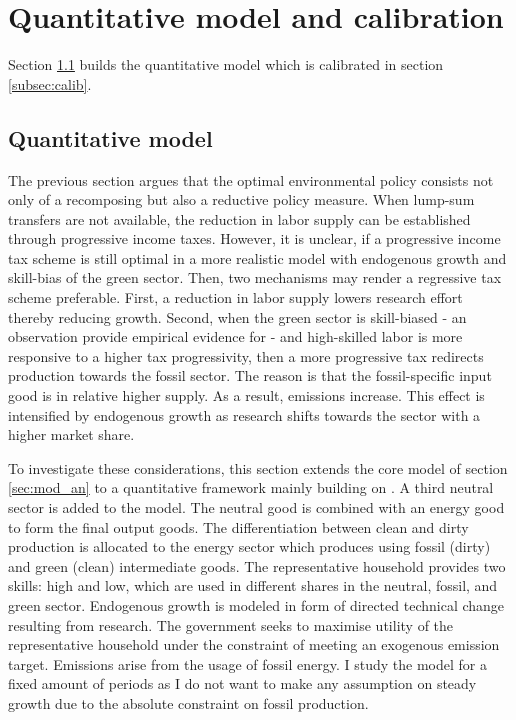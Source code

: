 \section{Quantitative model and calibration}\label{sec:model}
Section \ref{subsec:quantmod} builds the quantitative model which is calibrated in section \ref{subsec:calib}.

\subsection{Quantitative model}\label{subsec:quantmod}
The previous section argues that the optimal environmental policy consists not only of a recomposing but also a reductive policy measure. When lump-sum transfers are not available, the reduction in labor supply can be established through progressive income taxes. 
 However, it is unclear, if a progressive income tax scheme is still optimal in a more realistic model with endogenous growth and skill-bias of the green sector. Then, two mechanisms may render a regressive tax scheme preferable. First, a reduction in labor supply lowers research effort thereby reducing growth. Second, when the green sector is skill-biased - an observation \cite{Consoli2016DoCapital} provide empirical evidence for - and high-skilled labor is more responsive to a higher tax progressivity, then a more progressive tax redirects production towards the fossil sector. The reason is that the fossil-specific input good is in relative higher supply. As a result, emissions increase. This effect is intensified by endogenous growth as research shifts towards the sector with a higher market share.

To investigate these considerations, this section extends the core model of section \ref{sec:mod_an} to a quantitative framework mainly building on \cite{Fried2018ClimateAnalysis}.
A third neutral sector is added to the model. The neutral good is combined with an energy good to form  the final output goods. The differentiation between clean and dirty production is allocated to the energy sector which produces using fossil (dirty) and green (clean) intermediate goods.
The representative household provides two skills: high and low, which are used in different shares in the neutral, fossil, and green sector. 
Endogenous growth is modeled in form of directed technical change resulting from research. The government seeks to maximise utility of the representative household under the constraint of meeting an exogenous emission target. Emissions arise from the usage of fossil energy.
I study the model for a fixed amount of periods as I do not want to make any assumption on steady growth due to the absolute constraint on fossil production. 

